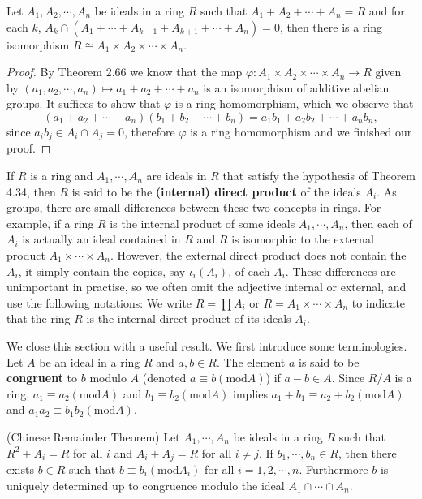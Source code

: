 \begin{theorem}
Let $A_1,A_2,\cdots,A_n$ be ideals in a ring $R$ such that $A_1+A_2+\cdots+A_n=R$ and for each $k$, $A_k\cap(A_1+\cdots+A_{k-1}+A_{k+1}+\cdots+A_n)=0$, then there is a ring isomorphism $R\cong A_1\times A_2\times\cdots\times A_n$.
\end{theorem}
\begin{proof}
By Theorem 2.66 we know that the map $\varphi:A_1\times A_2\times\cdots\times A_n\to R$ given by $(a_1,a_2,\cdots,a_n)\mapsto a_1+a_2+\cdots+a_n$ is an isomorphism of additive abelian groups. It suffices to show that $\varphi$ is a ring homomorphism, which we observe that 
$$
\left( a_1+a_2+\cdots +a_n \right) \left( b_1+b_2+\cdots +b_n \right) =a_1b_1+a_2b_2+\cdots +a_nb_n,
$$
since $a_ib_j\in A_i\cap A_j=0$, therefore $\varphi$ is a ring homomorphism and we finished our proof.
\end{proof}
If $R$ is a ring and $A_1,\cdots,A_n$ are ideals in $R$ that satisfy the hypothesis of Theorem 4.34, then $R$ is said to be the \textbf{(internal) direct product} of the ideals $A_i$. As groups, there are small differences between these two concepts in rings. For example, if a ring $R$ is the internal product of some ideals $A_1,\cdots,A_n$, then each of $A_i$ is actually an ideal contained in $R$ and $R$ is isomorphic to the external product $A_1\times\cdots\times A_n$. However, the external direct product does not contain the $A_i$, it simply contain the copies, say $\iota_i(A_i)$, of each $A_i$. These differences are unimportant in practise, so we often omit the adjective internal or external, and use the following notations: We write $R=\prod A_i$ or $R=A_1\times\cdots\times A_n$ to indicate that the ring $R$ is the internal direct product of its ideals $A_i$.\par
We close this section with a useful result. We first introduce some terminologies. Let $A$ be an ideal in a ring $R$ and $a,b\in R$. The element $a$ is said to be \textbf{congruent} to $b$ modulo $A$ (denoted $a\equiv b(\mathrm{mod}A)$) if $a-b\in A$. Since $R/A$ is a ring, $a_1\equiv a_2(\mathrm{mod}A)$ and $b_1\equiv b_2(\mathrm{mod}A)$ implies $a_1+b_1\equiv a_2+b_2(\mathrm{mod}A)$ and $a_1a_2\equiv b_1b_2(\mathrm{mod}A)$.
\begin{theorem}(Chinese Remainder Theorem)
Let $A_1,\cdots,A_n$ be ideals in a ring $R$ such that $R^2+A_i=R$ for all $i$ and $A_i+A_j=R$ for all $i\ne j$. If $b_1,\cdots,b_n\in R$, then there exists $b\in R$ such that $b\equiv b_i(\mathrm{mod}A_i)$ for all $i=1,2,\cdots,n$. Furthermore $b$ is uniquely determined up to congruence modulo the ideal $A_1\cap\cdots\cap A_n$.
\end{theorem}
